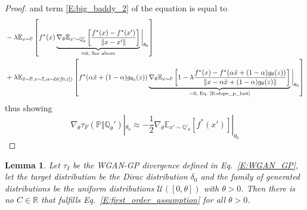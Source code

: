 \documentclass{article}
\newtheorem{lemma}{Lemma}
\begin{document}
\begin{proof}
  and term \ref{E:big_baddy_2} of the equation is equal to
  \begin{align*}
   &-\lambda\mathbb E_{x\sim\mathbb P}\left[f^*(x)\underbrace{\nabla_\theta\mathbb E_{x'\sim\mathbb Q'_\theta}\left[\frac{f^*(x)-f^*(x')}{\Vert x - x'\Vert}\right]}_{\approx 0, \text{ See above}}\bigg|_{\theta_0}\right]\\
   &+\lambda \mathbb E_{\tilde x\sim\mathbb P, z\sim\mathbb Z,\alpha\sim\mathcal U([0,\varepsilon])}\left[f^*(\alpha\tilde x + (1-\alpha)g_{\theta_0}(z))\underbrace{\nabla_\theta\mathbb E_{x\sim\mathbb P}\left[1-\lambda\frac{f^*(x)-f^*(\alpha\tilde x + (1-\alpha)g_{\theta}(z))}{\Vert x-\alpha\tilde x + (1-\alpha)g_{\theta}(z)\Vert}\right]}_{=0, \text{ Eq.\ \ref{E:slope_p_last}}}\bigg|_{\theta_0}\right]
  \end{align*}
  thus showing
  \[\nabla_\theta\tau_F(\mathbb P\Vert\mathbb Q_\theta')|_{\theta_0}\approx-\frac 1 2 \nabla_\theta\mathbb E_{x'\sim\mathbb Q'_\theta}[f^*(x')]|_{\theta_0}\]
\end{proof}
 


 \begin{lemma}\label{L:wgan_counterexample}
  Let $\tau_I$ be the WGAN-GP divergence defined in Eq.\ \ref{E:WGAN_GP}, let the target distribution be the Dirac distribution $\delta_0$
  and the family of generated distributions be the uniform distributions $\mathcal U([0,\theta])$ with $\theta> 0$. Then there is no
  $C\in\mathbb R$ that fulfills Eq.\ \ref{E:first_order_assumption} for all $\theta > 0$.
 \end{lemma}
\end{document}
